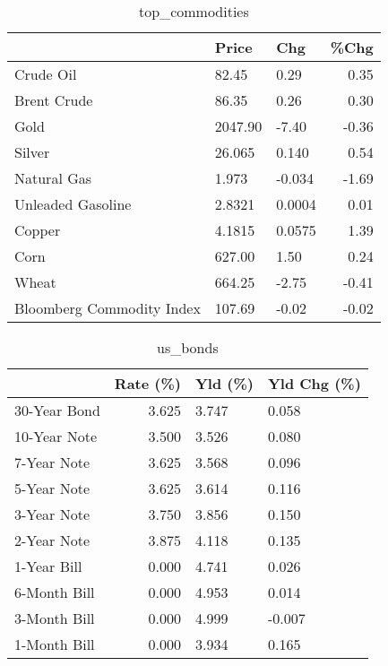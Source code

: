 \documentclass{article}%
\begin{document}
\begin{table}[htbp]%
\caption{top\_commodities}%
\centering%
\begin{adjustbox}{width=1\textwidth}%
\begin{tabular}{lllr}
\toprule
                          &   Price &    Chg &  \%Chg \\
\midrule
               Crude Oil  &   82.45 &   0.29 &  0.35 \\
             Brent Crude  &   86.35 &   0.26 &  0.30 \\
                    Gold  & 2047.90 &  -7.40 & -0.36 \\
                  Silver  &  26.065 &  0.140 &  0.54 \\
             Natural Gas  &   1.973 & -0.034 & -1.69 \\
       Unleaded Gasoline  &  2.8321 & 0.0004 &  0.01 \\
                  Copper  &  4.1815 & 0.0575 &  1.39 \\
                    Corn  &  627.00 &   1.50 &  0.24 \\
                   Wheat  &  664.25 &  -2.75 & -0.41 \\
Bloomberg Commodity Index &  107.69 &  -0.02 & -0.02 \\
\bottomrule
\end{tabular}
%
\end{adjustbox}%
\end{table}

%


\begin{table}[htbp]%
\caption{us\_bonds}%
\centering%
\begin{adjustbox}{width=1\textwidth}%
\begin{tabular}{lrll}
\toprule
             &  Rate (\%) & Yld (\%) & Yld Chg (\%) \\
\midrule
30-Year Bond &     3.625 &   3.747 &       0.058 \\
10-Year Note &     3.500 &   3.526 &       0.080 \\
 7-Year Note &     3.625 &   3.568 &       0.096 \\
 5-Year Note &     3.625 &   3.614 &       0.116 \\
 3-Year Note &     3.750 &   3.856 &       0.150 \\
 2-Year Note &     3.875 &   4.118 &       0.135 \\
 1-Year Bill &     0.000 &   4.741 &       0.026 \\
6-Month Bill &     0.000 &   4.953 &       0.014 \\
3-Month Bill &     0.000 &   4.999 &      -0.007 \\
1-Month Bill &     0.000 &   3.934 &       0.165 \\
\bottomrule
\end{tabular}
%
\end{adjustbox}%
\end{table}
\end{document}
